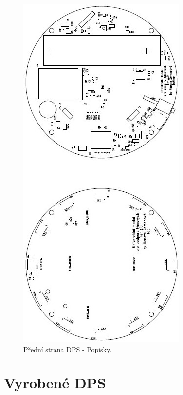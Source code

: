 \begin{figure}[!h]
	\begin{center}
	  \includegraphics[scale=1.1]{obrazky/Vyrobni_podkady_F_Silkscreen.jpg}
	\end{center}
	\caption[Přední strana DPS - Popisky]{Přední strana DPS - Popisky.}
\end{figure}

\chapter{Vyrobené DPS}

